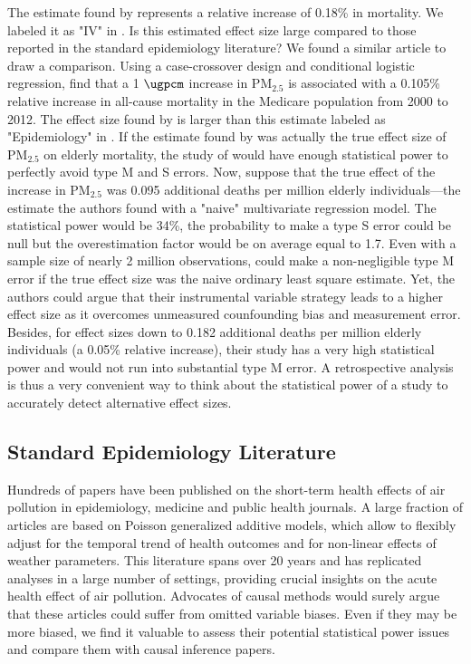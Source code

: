 \documentclass[12pt]{article}
\begin{document}
    The estimate found by \cite{deryugina_mortality_2019} represents a relative increase of 0.18\% in mortality. We labeled it as "IV" in . Is this estimated effect size large compared to those reported in the standard epidemiology literature? We found a similar article to draw a comparison. Using a case-crossover design and conditional logistic regression, \cite{di_association_2017} find that a 1 $\si{\ugpcm}$ increase in PM$_{2.5}$ is associated with a 0.105\% relative increase in all-cause mortality in the Medicare population from 2000 to 2012. The effect size found by \cite{deryugina_mortality_2019} is larger than this estimate labeled as "Epidemiology" in . If the estimate found by \cite{di_association_2017} was actually the true effect size of PM$_{2.5}$ on elderly mortality, the study of \cite{deryugina_mortality_2019} would have enough statistical power to perfectly avoid type M and S errors. Now, suppose that the true effect of the increase in PM$_{2.5}$ was 0.095 additional deaths per million elderly individuals---the estimate the authors found with a "naive" multivariate regression model. The statistical power would be 34\%, the probability to make a type S error could be null but the overestimation factor would be on average equal to 1.7. Even with a sample size of nearly 2 million observations, \cite{deryugina_mortality_2019} could make a non-negligible type M error if the true effect size was the naive ordinary least square estimate. Yet, the authors could argue that their instrumental variable strategy leads to a higher effect size as it overcomes unmeasured counfounding bias and measurement error. Besides, for effect sizes down to 0.182 additional deaths per million elderly individuals (a 0.05\% relative increase), their study has a very high statistical power and would not run into substantial type M error. A retrospective analysis is thus a very convenient way to think about the statistical power of a study to accurately detect alternative effect sizes.
    
    \subsection{Standard Epidemiology Literature}
    
        Hundreds of papers have been published on the short-term health effects of air pollution in epidemiology, medicine and public health journals. A large fraction of articles are based on Poisson generalized additive models, which allow to flexibly adjust for the temporal trend of health outcomes and for non-linear effects of weather parameters. This literature spans over 20 years and has replicated analyses in a large number of settings, providing crucial insights on the acute health effect of air pollution. Advocates of causal methods would surely argue that these articles could suffer from omitted variable biases. Even if they may be more biased, we find it valuable to assess their potential statistical power issues and compare them with causal inference papers.
\end{document}

